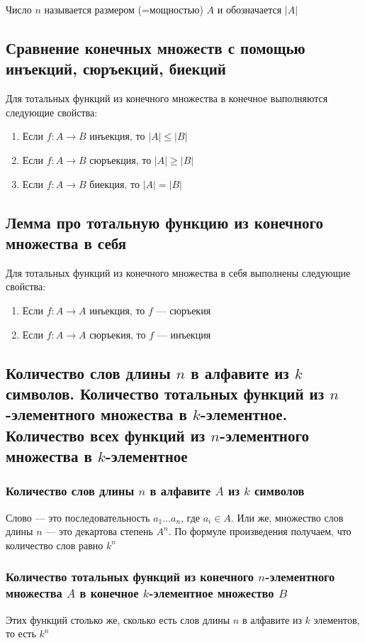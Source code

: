 \documentclass[a4paper]{article}
\begin{document}
 Число $n$ называется размером (=мощностью) $A$ и обозначается $|A|$

\subsection{Сравнение конечных множеств с помощью инъекций, сюръекций, биекций}
Для тотальных функций из конечного множества в конечное выполняются следующие свойства:
\begin{enumerate}
    \item Если $f: A\rightarrow B$ инъекция, то $|A|\leqslant|B|$
    \item Если $f: A\rightarrow B$ сюръекция, то $|A|\geqslant|B|$
    \item Если $f: A\rightarrow B$ биекция, то $|A|=|B|$
\end{enumerate}

\subsection{Лемма про тотальную функцию из конечного множества в себя}
Для тотальных функций из конечного множества в себя выполнены следующие свойства:
\begin{enumerate}
    \item Если $f: A\rightarrow A$ инъекция, то $f$ — сюръекия
    \item Если $f: A\rightarrow A$ сюръекия, то $f$ — инъекция
\end{enumerate}

\subsection{Количество слов длины $n$ в алфавите из $k$ символов. Количество тотальных функций из $n$-элементного множества в $k$-элементное. Количество всех функций из $n$-элементного множества в $k$-элементное}
\subsubsection*{Количество слов длины $n$ в алфавите $A$ из $k$ символов}
Слово — это последовательность $a_1\ldots a_n$, где $a_i\in A.$ Или же, множество слов длины $n$ — это декартова степень $A^n.$ По формуле произведения получаем, что количество слов равно $k^n$
\subsubsection*{Количество тотальных функций из конечного $n$-элементного множества $A$ в конечное $k$-элементное множество $B$}
Этих функций столько же, сколько есть слов длины $n$ в алфавите из $k$ элементов, то есть $k^n$
\end{document}
